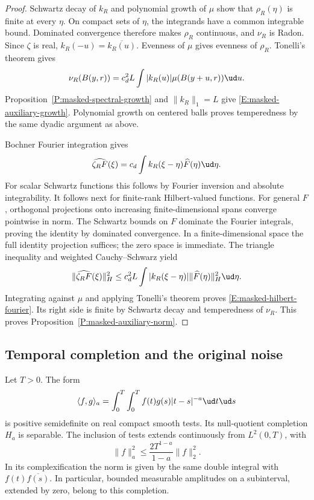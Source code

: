 \begin{proof}
  Schwartz decay of $k_R$ and polynomial growth of $\mu$ show that
  $\rho_R(\eta)$ is finite at every $\eta$. On compact sets of $\eta$,
  the integrands have a common integrable bound. Dominated convergence
  therefore makes $\rho_R$ continuous, and $\nu_R$ is Radon. Since
  $\zeta$ is real, $k_R(-u) = \overline{k_R(u)}$. Evenness of $\mu$
  gives evenness of $\rho_R$. Tonelli's theorem gives
  \[
    \nu_R(B(y,r)) = c_d^2L\int |k_R(u)|\mu(B(y+u,r))\ud u.
  \]
  Proposition~\ref{P:masked-spectral-growth} and $\|k_R\|_1 = L$ give
  \eqref{E:masked-auxiliary-growth}. Polynomial growth on centered balls
  proves temperedness by the same dyadic argument as above.

  Bochner Fourier integration gives
  \[
    \widehat{\zeta_RF}(\xi)
    = c_d\int k_R(\xi-\eta)\widehat F(\eta)\ud\eta.
  \]
  For scalar Schwartz functions this follows by Fourier inversion and
  absolute integrability. It follows next for finite-rank Hilbert-valued
  functions. For general $F$, orthogonal projections onto increasing
  finite-dimensional spans converge pointwise in norm. The Schwartz bounds
  on $F$ dominate the Fourier integrals, proving the identity by dominated
  convergence. In a finite-dimensional space the full identity projection
  suffices; the zero space is immediate. The triangle inequality and
  weighted Cauchy--Schwarz yield
  \[
    \|\widehat{\zeta_RF}(\xi)\|_H^2
    \le c_d^2L\int |k_R(\xi-\eta)|\|\widehat F(\eta)\|_H^2\ud\eta.
  \]
  Integrating against $\mu$ and applying Tonelli's theorem proves
  \eqref{E:masked-hilbert-fourier}. Its right side is finite by Schwartz
  decay and temperedness of $\nu_R$.
  This proves Proposition~\ref{P:masked-auxiliary-norm}.
\end{proof}

\subsection{Temporal completion and the original noise}

\begin{lemma}\label{L:masked-time-completion}
  Let $T > 0$. The form
  \[
    \langle f,g\rangle_a
    = \int_0^T\int_0^T f(t)g(s)|t-s|^{-a}\ud t\ud s
  \]
  is positive semidefinite on real compact smooth tests. Its null-quotient
  completion $H_a$ is separable. The inclusion of tests extends continuously
  from $L^2(0,T)$, with
  \begin{equation}\label{E:masked-time-schur}
    \|f\|_a^2 \le \frac{2T^{1-a}}{1-a}\|f\|_2^2.
  \end{equation}
  In its complexification the norm is given by the same double integral
  with $f(t)\overline{f(s)}$. In particular, bounded measurable amplitudes
  on a subinterval, extended by zero, belong to this completion.
\end{lemma}

